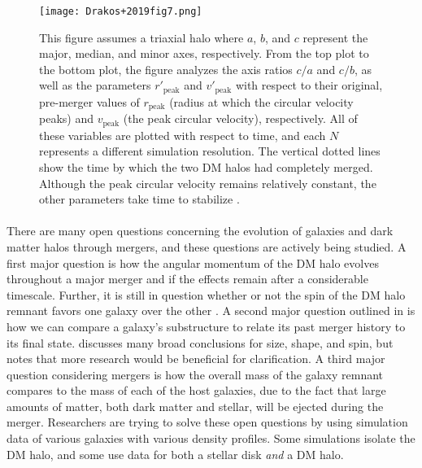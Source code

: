 \documentclass[fleqn,usenatbib]{mnras}
\begin{document}
\begin{figure}              
    \centering
    \texttt{[image: Drakos+2019fig7.png]}
    \caption{This figure assumes a triaxial halo where \( a \), \( b \), and \( c \) represent the major, median, and minor axes, respectively. From the top plot to the bottom plot, the figure analyzes the axis ratios \( c/a \) and \( c/b \), as well as the parameters \( r'_{\text{peak}} \) and \( v'_{\text{peak}} \) with respect to their original, pre-merger values of \( r_{\text{peak}} \) (radius at which the circular velocity peaks) and \( v_{\text{peak}} \) (the peak circular velocity), respectively. All of these variables are plotted with respect to time, and each \( N \) represents a different simulation resolution. The vertical dotted lines show the time by which the two DM halos had completely merged. Although the peak circular velocity remains relatively constant, the other parameters take time to stabilize \citep{Drakos+2019}.}
    \label{fig:DrakosMerger}
    
\end{figure}

\paragraph{} There are many open questions concerning the evolution of galaxies and dark matter halos through mergers, and these questions are actively being studied. A first major question is how the angular momentum of the DM halo evolves throughout a major merger and if the effects remain after a considerable timescale. Further, it is still in question whether or not the spin of the DM halo remnant favors one galaxy over the other \citep{Rod+2017}. A second major question outlined in \cite{Drakos+2019} is how we can compare a galaxy's substructure to relate its past merger history to its final state. \cite{Drakos+2019} discusses many broad conclusions for size, shape, and spin, but notes that more research would be beneficial for clarification. A third major question considering mergers is how the overall mass of the galaxy remnant compares to the mass of each of the host galaxies, due to the fact that large amounts of matter, both dark matter and stellar, will be ejected during the merger. Researchers are trying to solve these open questions by using simulation data of various galaxies with various density profiles. Some simulations isolate the DM halo, and some use data for both a stellar disk \textit{and} a DM halo. 
\end{document}
